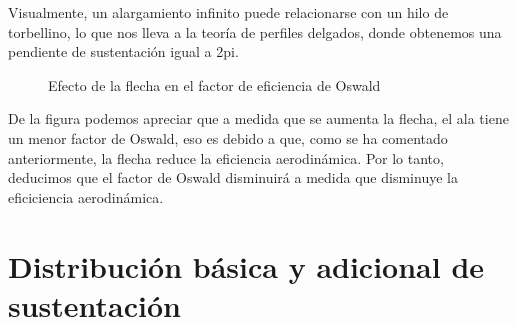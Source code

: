 \documentclass[9pt, a4paper]{article}
\begin{document}
Visualmente, un alargamiento infinito puede relacionarse con un hilo de torbellino, lo que nos lleva a la teoría de perfiles delgados, donde obtenemos una pendiente de sustentación igual a 2pi.

\begin{figure}[H]
  \begin{center}
    \caption{Efecto de la flecha en el factor de eficiencia de Oswald}
    \label{fig:hw2_4_sweep}
  \end{center}
\end{figure}

De la figura podemos apreciar que a medida que se aumenta la flecha, el ala tiene un menor factor de Oswald, eso es debido a que, como se ha comentado anteriormente, la flecha reduce la eficiencia aerodinámica. Por lo tanto, deducimos que el factor de Oswald disminuirá a medida que disminuye la eficiciencia aerodinámica.

\section{Distribución básica y adicional de sustentación}
\end{document}
